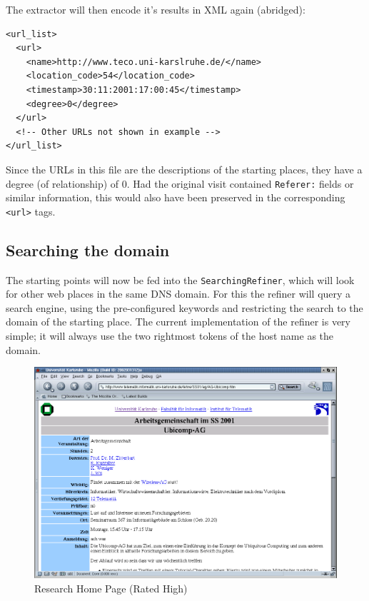 \documentclass[a4paper]{danarticle}
\theoremstyle{remark}
\begin{document}
      The extractor will then encode it's results in XML again (abridged):
      \begin{verbatim}
<url_list>
  <url> 
    <name>http://www.teco.uni-karslruhe.de/</name> 
    <location_code>54</location_code> 
    <timestamp>30:11:2001:17:00:45</timestamp> 
    <degree>0</degree> 
  </url> 
  <!-- Other URLs not shown in example --> 
</url_list>
      \end{verbatim}
      Since the URLs in this file are the descriptions of the starting places,
      they have a degree (of relationship) of 0. Had the original visit
      contained
      \verb$Referer:$  fields or similar information, this would also have been
      preserved in the corresponding \verb$<url>$ tags.
    \subsection{Searching the domain}
      The starting points will now be fed into the \verb$SearchingRefiner$,
      which will look for other web places in the same DNS domain. For this the
      refiner will query a search engine, using the pre-configured keywords and
      restricting the search to the domain of the starting place. The current
      implementation of the refiner is very simple; it will always use the two
      rightmost tokens of the host name as the domain. 
      
      
      
      \begin{figure}[ht]
        \centering
        \includegraphics[width=12cm]{ubicompag}
        \caption{Research Home Page (Rated High)}
        \label{ubicompag}
      \end{figure}
      
\end{document}
